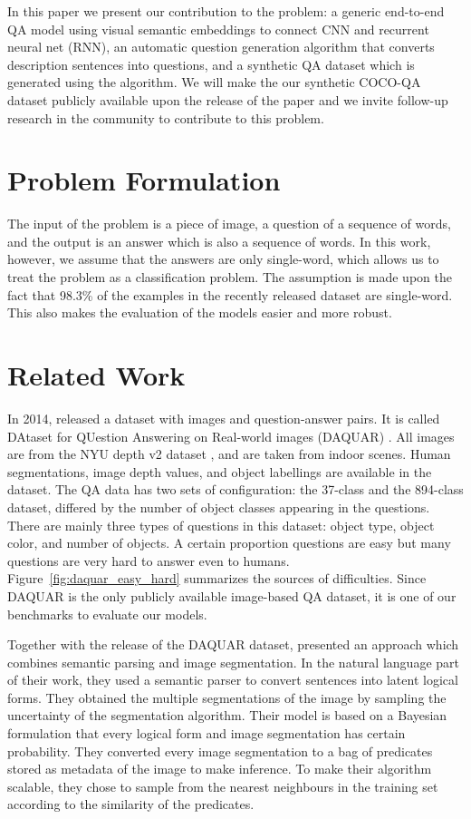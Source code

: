 \documentclass{article}
\renewcommand{\#}[1]{\textbf{#1}}
\begin{document}
In this paper we present our contribution to the problem: a generic end-to-end QA model using visual semantic embeddings to connect CNN and recurrent neural net (RNN), an automatic question generation algorithm that converts description sentences into questions, and a synthetic QA dataset which is generated using the algorithm. We will make the our synthetic COCO-QA dataset publicly available upon the release of the paper and we invite follow-up research in the community to contribute to this problem.

\section{Problem Formulation}
The input of the problem is a piece of image, a question of a sequence of words, and the output is an answer which is also a sequence of words. In this work, however, we assume that the answers are only single-word, which allows us to treat the problem as a classification problem. The assumption is made upon the fact that 98.3\% of the examples in the recently released dataset \cite{malinowski14a} are single-word. This also makes the evaluation of the models easier and more robust.

\section{Related Work}
In 2014, \cite{malinowski14a} released a dataset with images and question-answer pairs. It is called DAtaset for QUestion Answering on Real-world images (DAQUAR) . All images are from the NYU depth v2 dataset \cite{silberman12}, and are taken from indoor scenes. Human segmentations, image depth values, and object labellings are available in the dataset. The QA data has two sets of configuration: the 37-class and the 894-class dataset, differed by the number of object classes appearing in the questions. There are mainly three types of questions in this dataset: object type, object color, and number of objects. A certain proportion questions are easy but many questions are very hard to answer even to humans. Figure~\ref{fig:daquar_easy_hard} summarizes the sources of difficulties. Since DAQUAR is the only publicly available image-based QA dataset, it is one of our benchmarks to evaluate our models.

Together with the release of the DAQUAR dataset, \cite{malinowski14b} presented an approach which combines semantic parsing and image segmentation. In the natural language part of their work, they used a semantic parser \cite{liang13} to convert sentences into latent logical forms. They obtained the multiple segmentations of the image by sampling the uncertainty of the segmentation algorithm. Their model is based on a Bayesian formulation that every logical form and image segmentation has certain probability. They converted every image segmentation to a bag of predicates stored as metadata of the image to make inference. To make their algorithm scalable, they chose to sample from the nearest neighbours in the training set according to the similarity of the predicates.
\end{document}
